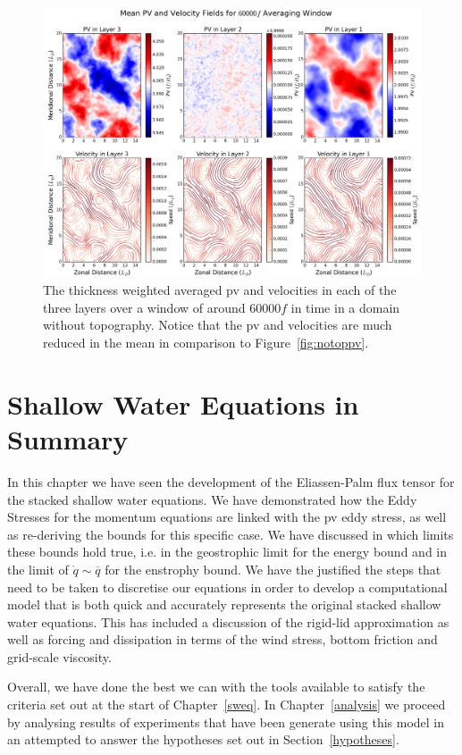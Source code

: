 \documentclass[12pt,a4paper]{report}
\newcommand*\thkmean[1]{\overline{#1}}
\newcommand*\spec[1]{\mathring{#1}}
\newcommand*\figref[1]{Figure~\ref{#1}}
\newcommand*\secref[1]{Section~\ref{#1}}
\begin{document}
  
  \begin{figure}
  	\centering
  	\includegraphics[width=0.8\linewidth]{notopmeanpv}
  	\caption{ The thickness weighted averaged \gls{pv} and velocities in each of the three layers
  		over a window of around $60000 f$ in time in a domain without topography. Notice
  		that the \gls{pv} and velocities are much reduced in the mean in comparison to
  		\figref{fig:notoppv}.}
  	\label{fig:notopmeanpv}
  \end{figure}
  
  \section{Shallow Water Equations in Summary}
  
  In this chapter we have seen the development of the Eliassen-Palm flux tensor
  for the stacked shallow water equations. We have demonstrated how the Eddy Stresses
  for the momentum equations are linked with the \gls{pv} eddy stress, as well
  as re-deriving the bounds for this specific case. We have discussed in which limits
  these bounds hold true, i.e. in the geostrophic limit for the energy bound
  and in the limit of $\spec{q} \sim \thkmean{q}$ for the enstrophy bound. We have the
  justified the steps that need to be taken to discretise our equations in order
  to develop a computational model that is both quick and accurately represents
  the original  stacked shallow water equations. This has included a discussion
  of the rigid-lid approximation as well as forcing and dissipation in terms
  of the wind stress, bottom friction and grid-scale viscosity. 
  
  Overall, we have done the best we can with the tools available to satisfy the
  criteria set out at the start of Chapter~\ref{sweq}. In Chapter~\ref{analysis} we
  proceed by analysing results of experiments that have been generate using this
  model in an attempted to answer the hypotheses set out in \secref{hypotheses}.
\end{document}
